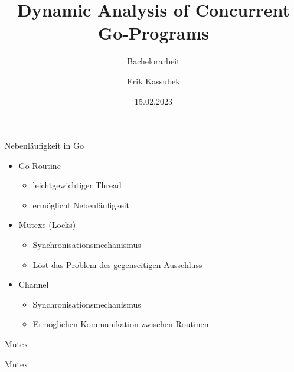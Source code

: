 \documentclass[aspectratio=169]{beamer}  %
\author[Erik Kassubek]{Erik Kassubek}
\title[Dynamic Analysis of Concurrent Go-Programs]{Dynamic Analysis of Concurrent Go-Programs}
\subtitle{Bachelorarbeit}
\institute[]{Institut für Informatik\\Albert-Ludwigs-Universität Freiburg}
\date{15.02.2023}
\begin{document}
\frame{
    \titlepage
}



\begin{frame}{Nebenläufigkeit in Go}
    \begin{itemize}
      \item Go-Routine
      \begin{itemize}
        \item leichtgewichtiger Thread
        \item ermöglicht Nebenläufigkeit
      \end{itemize}
      \item Mutexe (Locks)
      \begin{itemize}
        \item Synchronisationsmechanismus
        \item Löst das Problem des gegenseitigen Ausschluss
      \end{itemize}
      \item Channel
      \begin{itemize}
        \item Synchronisationsmechanismus
        \item Ermöglichen Kommunikation zwischen Routinen
      \end{itemize}
    \end{itemize}
\end{frame}


\begin{frame}{Mutex}
  \begin{minipage}{0.49\textwidth}
    
  \end{minipage}
  \hfill
  \hfill
  \begin{minipage}{0.49\textwidth}
  \end{minipage}
\end{frame}

\begin{frame}{Mutex}
  \begin{minipage}[t]{0.49\textwidth}
    
  \end{minipage}
  \hfill
  \hfill
  \begin{minipage}[t]{0.49\textwidth}
  \end{minipage}
\end{frame}
\end{document}

